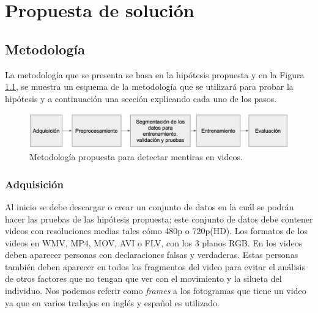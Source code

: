\chapter{Propuesta de solución} %
\label{Chapter4} %
\begin{onehalfspacing}

\section{Metodología}
\label{sec:Metodologia}

La metodología que se presenta se basa en la hipótesis propuesta y en la Figura \ref{fig:Fig_Metodologia}, se muestra un esquema de la metodología que se utilizará para probar la hipótesis y a continuación una sección explicando cada uno de los pasos.

\begin{figure}[h!]
	\centering
	\includegraphics[width=18cm,keepaspectratio]{XX_Figures/Fig_Metodologia.pdf}
	\caption{\footnotesize Metodología propuesta para detectar mentiras en videos.}
	\label{fig:Fig_Metodologia}
\end{figure}

\subsection{Adquisición}
\label{sec:Adquisicion}
Al inicio se debe descargar o crear un conjunto de datos en la cuál se podrán hacer las pruebas de las hipótesis propuesta; este conjunto de datos debe contener videos con resoluciones medias tales cómo 480p o 720p(HD). Los formatos de los videos en WMV, MP4, MOV, AVI o FLV, con los 3 planos RGB. En los videos deben aparecer personas con declaraciones falsas y verdaderas. Estas personas también deben aparecer en todos los fragmentos del video para evitar el análisis de otros factores que no tengan que ver con el movimiento y la silueta del individuo. Nos podemos referir como \textit{frames} a los fotogramas que tiene un video ya que en varios trabajos en inglés y español es utilizado.\\


\end{onehalfspacing}

